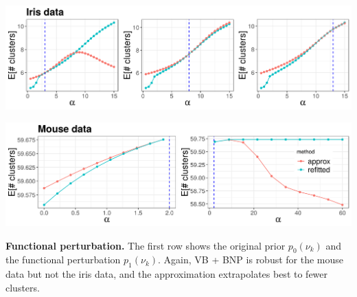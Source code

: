 \documentclass[a0,plainsections,30pt]{sciposter}\usepackage[]{graphicx}\usepackage[]{color}
\newenvironment{knitrout}{}{} %
\begin{document}
\begin{minipage}[t]{0.45\textwidth}
\vspace{0.05in}
%

\begin{knitrout}
\color{fgcolor}

{\centering \includegraphics[width=0.98\linewidth,height=0.294\linewidth]{figure/param_sens_plot-1} 

}



\end{knitrout}

\begin{knitrout}
\color{fgcolor}

{\centering \includegraphics[width=0.98\linewidth,height=0.294\linewidth]{figure/gene_param_sens_plot-1} 

}



\end{knitrout}

\textbf{Functional perturbation.} The first row shows the original prior
$p_0(\nu_k)$ and the functional perturbation $p_1(\nu_k)$.  Again, VB + BNP
is robust for the mouse data but not the iris data, and the approximation
extrapolates best to fewer clusters.

\vspace{0.1in}

\begin{knitrout}
\color{fgcolor}


\end{knitrout}
\end{minipage}
\end{document}
